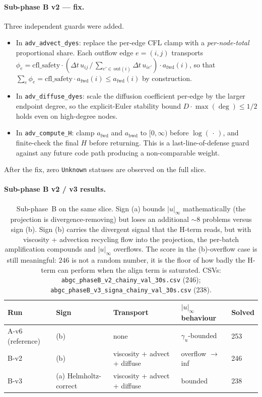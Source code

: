 \documentclass[11pt]{article}
\newcommand{\lpath}[1]{\texttt{\nolinkurl{#1}}}
\newcommand{\lid}[1]{{\ttfamily\nolinkurl{#1}}}
\begin{document}
\paragraph{Sub-phase B v2 --- fix.}
Three independent guards were added.
\begin{itemize}
\item In \lid{adv_advect_dyes}: replace the per-edge CFL clamp with a
      \emph{per-node-total} proportional share. Each outflow edge $e = (i,j)$
      transports
      $\phi_e = \mathrm{cfl\_safety}\cdot(\Delta t\, u_{ij}\,/\,\!\sum_{e' \in\, \mathrm{out}(i)} \Delta t\, u_{ie'})\cdot a_\mathrm{fwd}(i)$,
      so that $\sum_e \phi_e = \mathrm{cfl\_safety}\cdot a_\mathrm{fwd}(i) \leq a_\mathrm{fwd}(i)$
      by construction.
\item In \lid{adv_diffuse_dyes}: scale the diffusion coefficient per-edge by
      the larger endpoint degree, so the explicit-Euler stability bound
      $D \cdot \max(\deg) \leq 1/2$ holds even on high-degree nodes.
\item In \lid{adv_compute_H}: clamp $a_\mathrm{fwd}$ and $a_\mathrm{bwd}$ to
      $[0, \infty)$ before $\log(\,\cdot\,)$, and finite-check the final
      $H$ before returning. This is a last-line-of-defense guard against any
      future code path producing a non-comparable weight.
\end{itemize}
After the fix, zero \lid{Unknown} statuses are observed on the full slice.

\paragraph{Sub-phase B v2 / v3 results.}
\begin{table}[t]
\centering
\begin{tabular}{lllll}
\toprule
Run & Sign & Transport & $|u|_\infty$ behaviour & Solved \\
\midrule
A-v6 (reference) & (b) & none & $\gamma_u$-bounded & 253 \\
B-v2 & (b) & viscosity + advect + diffuse & overflow $\to$ inf & 246 \\
B-v3 & (a) Helmholtz-correct & viscosity + advect + diffuse & bounded & 238 \\
\bottomrule
\end{tabular}
\caption{Sub-phase~B on the same slice. Sign (a) bounds $|u|_\infty$
mathematically (the projection is divergence-removing) but loses an
additional $\sim 8$ problems versus sign (b). Sign (b) carries the
divergent signal that the H-term reads, but with viscosity + advection
recycling flow into the projection, the per-batch amplification
compounds and $|u|_\infty$ overflows. The score in the (b)-overflow
case is still meaningful: $246$ is not a random number, it is the
floor of how badly the H-term can perform when the align term is
saturated. CSVs:
\lpath{abgc_phaseB_v2_chainy_val_30s.csv} (246);
\lpath{abgc_phaseB_v3_signa_chainy_val_30s.csv} (238).}
\label{tab:phaseB}
\end{table}
\end{document}
